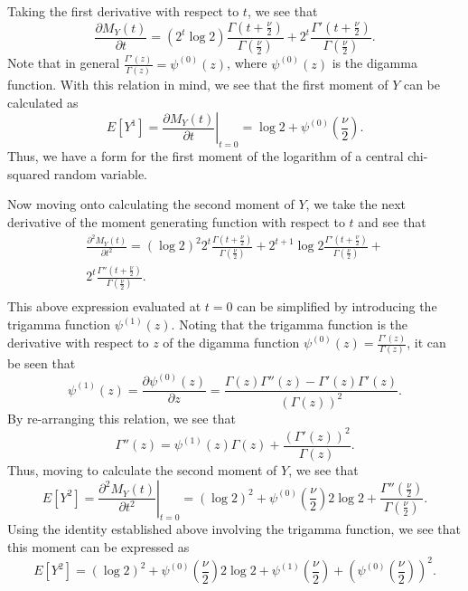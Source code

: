 Taking the first derivative with respect to $t$, we see that
\begin{equation*}
	\frac{\partial M_Y(t)}{\partial t} = (2^t \log 2) \frac{\Gamma (t + \frac{\nu}{2})}{\Gamma (\frac{\nu}{2})} + 2^t \frac{\Gamma ' (t + \frac{\nu}{2})}{\Gamma (\frac{\nu}{2})} .
\end{equation*}
Note that in general $\frac{\Gamma ' (z)}{\Gamma (z)} = \psi^{(0)}(z)$, where $\psi^{(0)}(z)$ is the digamma function. With this relation in mind, we see that the first moment of
$Y$ can be calculated as
\begin{equation*}
	E \left[ Y^1 \right] =  \left. \frac{\partial M_Y(t)}{\partial t} \right|_{t=0} = \log 2 + \psi^{(0)} \left( \frac{\nu}{2} \right) .
\end{equation*}
Thus, we have a form for the first moment of the logarithm of a central chi-squared random variable.

Now moving onto calculating the second moment of $Y$, we take the next derivative of the moment generating function with respect to $t$ and see that
\begin{equation*}
	\begin{split}
		\frac{\partial^2 M_Y(t)}{\partial t^2} = (\log 2)^2 2^t  \frac{\Gamma (t + \frac{\nu}{2})}{\Gamma (\frac{\nu}{2})} + 2^{t+1} \log 2 \frac{\Gamma ' (t + \frac{\nu}{2})}{\Gamma (\frac{\nu}{2})} + \\ 
		2^t \frac{\Gamma '' (t + \frac{\nu}{2})}{\Gamma (\frac{\nu}{2})} .\\
	\end{split}
\end{equation*}
This above expression evaluated at $t = 0$ can be simplified by introducing the trigamma function $ \psi^{(1)}(z)$. Noting that the trigamma function is the derivative with respect
to $z$ of the digamma function $\psi^{(0)}(z) = \frac{\Gamma ' (z)}{\Gamma (z)}$, it can be seen that
\begin{equation*}
	\psi^{(1)}(z) = \frac{\partial \psi^{(0)}(z)}{\partial z} = \frac{\Gamma (z) \Gamma '' (z) - \Gamma '(z) \Gamma '(z)}{(\Gamma(z))^2} .
\end{equation*}
By re-arranging this relation, we see that
\begin{equation*}
	\Gamma ''(z) = \psi^{(1)}(z) \Gamma(z) + \frac{(\Gamma '(z))^2}{\Gamma(z)} .
\end{equation*}
Thus, moving to calculate the second moment of $Y$, we see that
\begin{equation*}
	E \left[ Y^2 \right] =  \left. \frac{\partial^2 M_Y(t)}{\partial t^2} \right|_{t=0} =
	(\log 2)^2 + \psi^{(0)} \left( \frac{\nu}{2} \right) 2 \log 2  + \frac{\Gamma '' (\frac{\nu}{2})}{\Gamma (\frac{\nu}{2})} .
\end{equation*}
Using the identity established above involving the trigamma function, we see that this moment can be expressed as
\begin{equation*}
	E \left[ Y^2 \right] =
	(\log 2)^2 + \psi^{(0)} \left( \frac{\nu}{2} \right) 2 \log 2  + \psi^{(1)} \left( \frac{\nu}{2} \right) + \left( \psi^{(0)} \left( \frac{\nu}{2} \right) \right)^2 .
\end{equation*}

